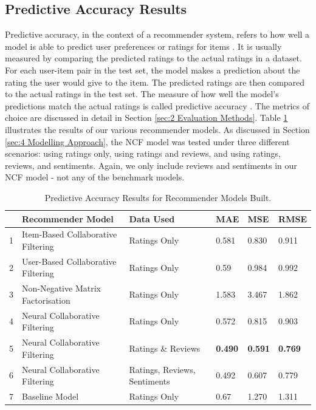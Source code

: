 \subsection{Predictive Accuracy Results}
\label{subsec:Predictive Accuracy Results}

Predictive accuracy, in the context of a recommender system, refers to how well a model is able to predict user preferences or ratings for items \cite{breese2013empirical}. It is usually measured by comparing the predicted ratings to the actual ratings in a dataset. For each user-item pair in the test set, the model makes a prediction about the rating the user would give to the item. The predicted ratings are then compared to the actual ratings in the test set. The measure of how well the model's predictions match the actual ratings is called predictive accuracy \cite{huang2004applying}. The metrics of choice are discussed in detail in Section \ref{sec:2 Evaluation Methods}. Table \ref{tab:pred_acc_res} illustrates the results of our various recommender models. As discussed in Section \ref{sec:4 Modelling Approach}, the NCF model was tested under three different scenarios: using ratings only, using ratings and reviews, and using ratings, reviews, and sentiments. Again, we only include reviews and sentiments in our NCF model - not any of the benchmark models.

\begin{table}[htbp]
    \centering
    \begin{tabular}{|l|l|l|l|l|l|}
    \hline
    \textbf{} & \textbf{Recommender Model} & \textbf{Data Used} & \textbf{MAE} & \textbf{MSE} & \textbf{RMSE} \\
    \hline
    1 &Item-Based Collaborative Filtering & Ratings Only & 0.581 & 0.830 & 0.911 \\
    2 & User-Based Collaborative Filtering & Ratings Only & 0.59 & 0.984 & 0.992 \\
    3& Non-Negative Matrix Factorisation & Ratings Only & 1.583 & 3.467 & 1.862 \\
    4&Neural Collaborative Filtering & Ratings Only & 0.572 & 0.815 & 0.903 \\
    5&Neural Collaborative Filtering & Ratings \& Reviews & \textbf{0.490} & \textbf{0.591} & \textbf{0.769}  \\
    6&Neural Collaborative Filtering & Ratings, Reviews, Sentiments & 0.492 & 0.607 & 0.779 \\
    7&Baseline Model & Ratings Only & 0.67 & 1.270 & 1.311 \\
    \hline
    \end{tabular}
    \caption{Predictive Accuracy Results for Recommender Models Built.}
    \label{tab:pred_acc_res}
\end{table}

